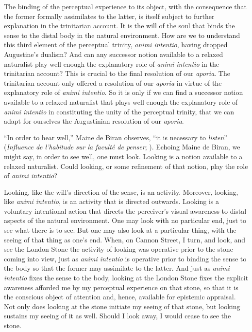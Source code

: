 \documentclass[12pt]{article}
\begin{document}
The binding of the perceptual experience to its object, with the consequence that the former formally assimilates to the latter, is itself subject to further explanation in the trinitarian account. It is the will of the soul that binds the sense to the distal body in the natural environment. How are we to understand this third element of the perceptual trinity, \emph{animi intentio}, having dropped Augustine's dualism? And can any successor notion available to a relaxed naturalist play well enough the explanatory role of \emph{animi intentio} in the trinitarian account? This is crucial to the final resolution of our \emph{aporia}. The trinitarian account only offered a resolution of our \emph{aporia} in virtue of the explanatory role of \emph{animi intentio}. So it is only if we can find a successor notion available to a relaxed naturalist that plays well enough the explanatory role of \emph{animi intentio} in constituting the unity of the perceptual trinity, that we can adapt for ourselves the Augustinian resolution of our \emph{aporia}.

``In order to hear well,'' Maine de Biran observes, ``it is necessary to \emph{listen}'' (\emph{Influence de l'habitude sur la faculté de penser}; \citealt[63--4]{Boehm:1929aa}). Echoing Maine de Biran, we might say, in order to see well, one must look. Looking is a notion available to a relaxed naturalist. Could looking, or some refinement of that notion, play the role of \emph{animi intentio}?

Looking, like the will's direction of the sense, is an activity. Moreover, looking, like \emph{animi intentio}, is an activity that is directed outwards. Looking is a voluntary intentional action that directs the perceiver's visual awareness to distal aspects of the natural environment. One may look with no particular end, just to see what there is to see. But one may also look at a particular thing, with the seeing of that thing as one's end. When, on Cannon Street, I turn, and look, and see the London Stone the activity of looking was operative prior to the stone coming into view, just as \emph{animi intentio} is operative prior to binding the sense to the body so that the former may assimilate to the latter. And just as \emph{animi intentio} fixes the sense to the body, looking at the London Stone fixes the explicit awareness afforded me by my perceptual experience on that stone, so that it is the conscious object of attention and, hence, available for epistemic appraisal. Not only does looking at the stone initiate my seeing of that stone, but looking sustains my seeing of it as well. Should I look away, I would cease to see the stone.
\end{document}
